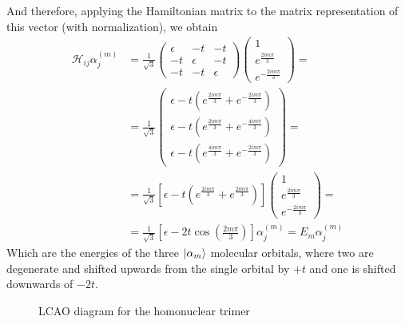 \documentclass[../qm.tex]{subfiles}
\begin{document}
	And therefore, applying the Hamiltonian matrix to the matrix representation of this vector (with normalization), we obtain
	\begin{equation}
		\begin{aligned}
			\mathcal{H}_{ij}\alpha^{(m)}_j&=\frac{1}{\sqrt{3}}\begin{pmatrix}\epsilon&-t&-t\\-t&\epsilon&-t\\-t&-t&\epsilon\end{pmatrix}\begin{pmatrix}1\\e^{\frac{2im\pi}{3}}\\e^{-\frac{2im\pi}{3}}\end{pmatrix}=\\
			&=\frac{1}{\sqrt{3}}\begin{pmatrix}\epsilon-t\left( e^{\frac{2im\pi}{3}}+e^{-\frac{2im\pi}{3}} \right)\\\epsilon-t\left( e^{\frac{2im\pi}{3}}+e^{-\frac{4im\pi}{3}} \right)\\\epsilon-t\left( e^{\frac{4im\pi}{3}}+e^{-\frac{2im\pi}{3}} \right)\end{pmatrix}=\\
			&=\frac{1}{\sqrt{3}}\left[ \epsilon-t\left( e^{\frac{2im\pi}{3}}+e^{\frac{2im\pi}{3}} \right) \right]\begin{pmatrix}1\\e^{\frac{2im\pi}{3}}\\e^{-\frac{2im\pi}{3}}\end{pmatrix}=\\
			&=\frac{1}{\sqrt{3}}\left[ \epsilon-2t\cos\left( \frac{2m\pi}{3} \right) \right]\alpha_j^{(m)}=E_m\alpha_j^{(m)}
		\end{aligned}
		\label{eq:trimerenergy}
	\end{equation}
	Which are the energies of the three $\ket{\alpha_m}$ molecular orbitals, where two are degenerate and shifted upwards from the single orbital by $+t$ and one is shifted downwards of $-2t$.
	\begin{figure}[H]
		\centering
		\caption{LCAO diagram for the homonuclear trimer}
		\label{fig:homotrimerlcao}
	\end{figure}
\end{document}
